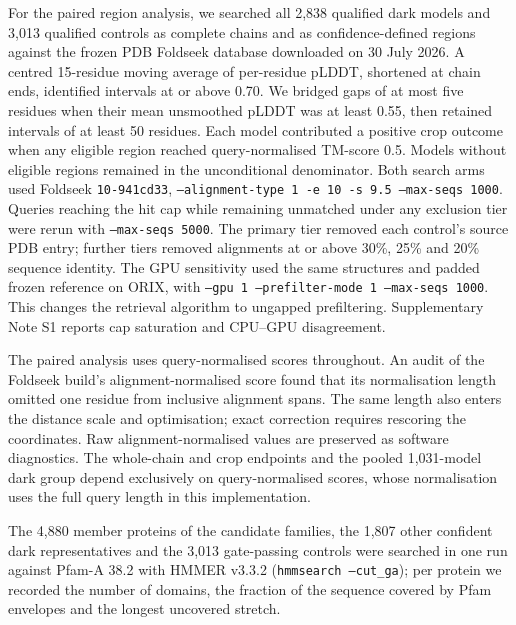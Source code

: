 \documentclass[11pt]{article}
\begin{document}
For the paired region analysis, we searched all 2{,}838 qualified dark models and 3{,}013
qualified controls as complete chains and as confidence-defined regions against the frozen
PDB Foldseek database downloaded on 30 July 2026. A centred 15-residue moving average of
per-residue pLDDT, shortened at chain ends, identified intervals at or above 0.70.
We bridged gaps of at most five residues when their mean unsmoothed pLDDT was at least 0.55,
then retained intervals of at least 50 residues. Each model contributed a positive crop outcome
when any eligible region reached query-normalised TM-score 0.5. Models without eligible
regions remained in the unconditional denominator. Both search arms used Foldseek
\texttt{10-941cd33}, \texttt{--alignment-type 1 -e 10 -s 9.5 --max-seqs 1000}.
Queries reaching the hit cap while remaining unmatched under any exclusion tier were rerun
with \texttt{--max-seqs 5000}. The primary tier removed each control's source PDB entry;
further tiers removed alignments at or above 30\%, 25\% and 20\% sequence identity.
The GPU sensitivity used the same structures and padded frozen reference on ORIX, with
\texttt{--gpu 1 --prefilter-mode 1 --max-seqs 1000}. This changes the retrieval algorithm to
ungapped prefiltering. Supplementary Note S1 reports cap saturation and CPU--GPU disagreement.

The paired analysis uses query-normalised scores throughout. An audit of the Foldseek build's
alignment-normalised score found that its normalisation length omitted one residue from
inclusive alignment spans. The same length also enters the distance scale and optimisation;
exact correction requires rescoring the coordinates. Raw alignment-normalised values are
preserved as software diagnostics. The whole-chain and crop endpoints and the pooled
1{,}031-model dark group depend exclusively on query-normalised scores, whose normalisation
uses the full query length in this implementation.


The 4{,}880 member proteins of
the candidate families, the 1{,}807 other confident dark representatives and the 3{,}013 gate-passing
controls were searched in one run against Pfam-A 38.2 with HMMER v3.3.2 (\texttt{hmmsearch --cut\_ga});
per protein we recorded the number of domains, the fraction of the sequence covered by Pfam
envelopes and the longest uncovered stretch.
\end{document}
